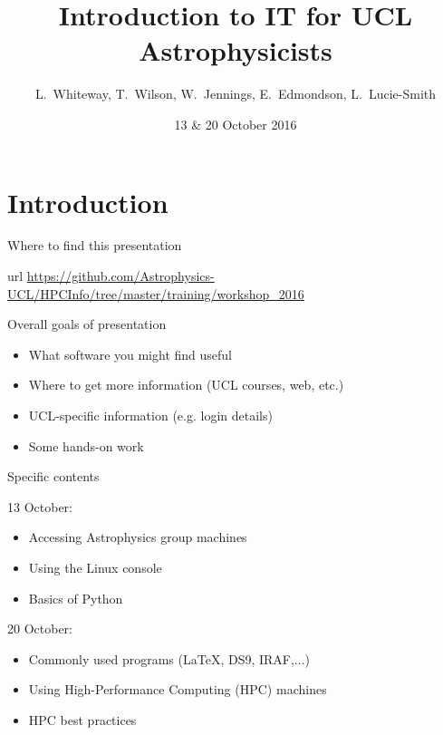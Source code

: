 \documentclass{beamer}
\title[IT Workshops] %
{Introduction to IT for UCL Astrophysicists}
\author{L.~Whiteway, T.~Wilson, W.~Jennings, E.~Edmondson, L.~Lucie-Smith}
\institute[UCL]
{
  Department of Physics and Astronomy\\
  University College London
}
\date[IT 2016]
{13 \& 20 October 2016}
\begin{document}
\frame{\titlepage}

\section{Introduction}

\begin{frame}{Where to find this presentation}
  \begin{block}{url}
    \url{https://github.com/Astrophysics-UCL/HPCInfo/tree/master/training/workshop_2016}
  \end{block}
\end{frame}


\begin{frame}{Overall goals of presentation}
  \begin{itemize}
    \item What software you might find useful
    \item Where to get more information (UCL courses, web, etc.)
    \item UCL-specific information (e.g. login details)
    \item Some hands-on work
  \end{itemize}
\end{frame}

\begin{frame}{Specific contents}

  \begin{block}{13 October:}
    \begin{itemize}
      \item Accessing Astrophysics group machines
      \item Using the Linux console
      \item Basics of Python
    \end{itemize}
  \end{block}
  
  \begin{block}{20 October:}
    \begin{itemize}
    \item Commonly used programs (LaTeX, DS9, IRAF,...)
    \item Using High-Performance Computing (HPC) machines
    \item HPC best practices
    \end{itemize}
  \end{block}

\end{frame}
\end{document}
